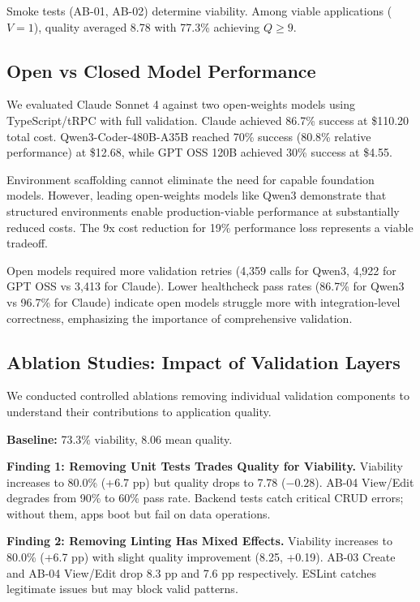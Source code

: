 \documentclass{article}
\begin{document}
Smoke tests (AB-01, AB-02) determine viability. Among viable applications ($V=1$), quality averaged 8.78 with 77.3\% achieving $Q \geq 9$.

\subsection{Open vs Closed Model Performance}

We evaluated Claude Sonnet 4 against two open-weights models using TypeScript/tRPC with full validation. Claude achieved 86.7\% success at \$110.20 total cost. Qwen3-Coder-480B-A35B reached 70\% success (80.8\% relative performance) at \$12.68, while GPT OSS 120B achieved 30\% success at \$4.55.

Environment scaffolding cannot eliminate the need for capable foundation models. However, leading open-weights models like Qwen3 demonstrate that structured environments enable production-viable performance at substantially reduced costs. The 9x cost reduction for 19\% performance loss represents a viable tradeoff.

Open models required more validation retries (4,359 calls for Qwen3, 4,922 for GPT OSS vs 3,413 for Claude). Lower healthcheck pass rates (86.7\% for Qwen3 vs 96.7\% for Claude) indicate open models struggle more with integration-level correctness, emphasizing the importance of comprehensive validation.

\subsection{Ablation Studies: Impact of Validation Layers}

We conducted controlled ablations removing individual validation components to understand their contributions to application quality.

\textbf{Baseline:} 73.3\% viability, 8.06 mean quality.

\textbf{Finding 1: Removing Unit Tests Trades Quality for Viability.} Viability increases to 80.0\% (+6.7 pp) but quality drops to 7.78 ($-0.28$). AB-04 View/Edit degrades from 90\% to 60\% pass rate. Backend tests catch critical CRUD errors; without them, apps boot but fail on data operations.

\textbf{Finding 2: Removing Linting Has Mixed Effects.} Viability increases to 80.0\% (+6.7 pp) with slight quality improvement (8.25, +0.19). AB-03 Create and AB-04 View/Edit drop 8.3 pp and 7.6 pp respectively. ESLint catches legitimate issues but may block valid patterns.
\end{document}
